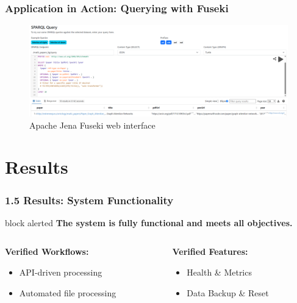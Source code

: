 \documentclass{beamer}
\begin{document}
\begin{frame}
    \frametitle{Application in Action: Querying with Fuseki}
    \begin{figure}
        \includegraphics[width=\textwidth]{ajf.png}
        \caption{Apache Jena Fuseki web interface}
    \end{figure}
\end{frame}


\section{Results}

\begin{frame}
    \frametitle{1.5 Results: System Functionality}
    
    \begin{beamercolorbox}[sep=1em]{block alerted}
        \centering\Large\bfseries The system is fully functional and meets all objectives.
    \end{beamercolorbox}
    
    \vspace{1cm}
    
    \begin{columns}
        \begin{column}{0.5\textwidth}
            \textbf{Verified Workflows:}
            \begin{itemize}
                \item<2-> API-driven processing
                \item<2-> Automated file processing
            \end{itemize}
        \end{column}
        \begin{column}{0.5\textwidth}
            \textbf{Verified Features:}
            \begin{itemize}
                \item<3-> Health \& Metrics
                \item<3-> Data Backup \& Reset
            \end{itemize}
        \end{column}
    \end{columns}
\end{frame}
\end{document}
